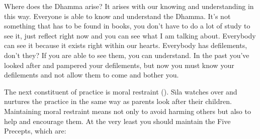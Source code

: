Where does the Dhamma arise? It arises with our knowing and understanding in this way. Everyone is able to know and understand the Dhamma. It's not something that has to be found in books, you don't have to do a lot of study to see it, just reflect right now and you can see what I am talking about. Everybody can see it because it exists right within our hearts. Everybody has defilements, don't they? If you are able to see them, you can understand. In the past you've looked after and pampered your defilements, but now you must know your defilements and not allow them to come and bother you.

The next constituent of practice is moral restraint (). S\={\i}la watches over and nurtures the practice in the same way as parents look after their children. Maintaining moral restraint means not only to avoid harming others but also to help and encourage them. At the very least you should maintain the Five Precepts, which are:

